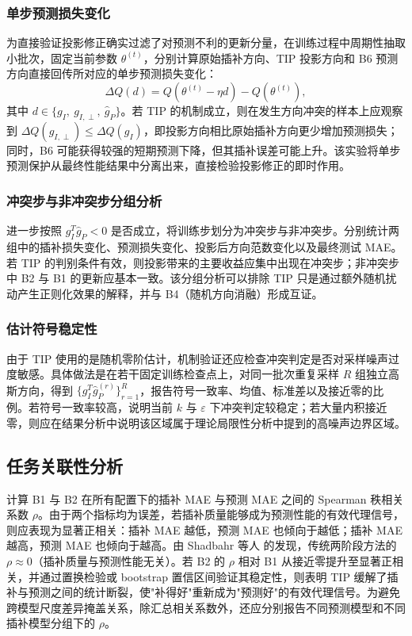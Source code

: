 \documentclass{article}
\begin{document}
\subsubsection{单步预测损失变化}

为直接验证投影修正确实过滤了对预测不利的更新分量，在训练过程中周期性抽取小批次，固定当前参数 $\theta^{(t)}$，分别计算原始插补方向、TIP 投影方向和 B6 预测方向直接回传所对应的单步预测损失变化：
\begin{equation}
	\Delta Q(d)=Q(\theta^{(t)}-\eta d)-Q(\theta^{(t)}),
\end{equation}
其中 $d\in\{g_I,\ g_{I,\perp},\ \hat{g}_P\}$。若 TIP 的机制成立，则在发生方向冲突的样本上应观察到 $\Delta Q(g_{I,\perp}) \leq \Delta Q(g_I)$，即投影方向相比原始插补方向更少增加预测损失；同时，B6 可能获得较强的短期预测下降，但其插补误差可能上升。该实验将单步预测保护从最终性能结果中分离出来，直接检验投影修正的即时作用。

\subsubsection{冲突步与非冲突步分组分析}

进一步按照 $g_I^T\hat{g}_P<0$ 是否成立，将训练步划分为冲突步与非冲突步。分别统计两组中的插补损失变化、预测损失变化、投影后方向范数变化以及最终测试 MAE。若 TIP 的判别条件有效，则投影带来的主要收益应集中出现在冲突步；非冲突步中 B2 与 B1 的更新应基本一致。该分组分析可以排除 TIP 只是通过额外随机扰动产生正则化效果的解释，并与 B4（随机方向消融）形成互证。

\subsubsection{估计符号稳定性}

由于 TIP 使用的是随机零阶估计，机制验证还应检查冲突判定是否对采样噪声过度敏感。具体做法是在若干固定训练检查点上，对同一批次重复采样 $R$ 组独立高斯方向，得到 $\{g_I^T\hat{g}_{P}^{(r)}\}_{r=1}^R$，报告符号一致率、均值、标准差以及接近零的比例。若符号一致率较高，说明当前 $k$ 与 $\varepsilon$ 下冲突判定较稳定；若大量内积接近零，则应在结果分析中说明该区域属于理论局限性分析中提到的高噪声边界区域。

\subsection{任务关联性分析}\label{sec:spearman}

计算 B1 与 B2 在所有配置下的插补 MAE 与预测 MAE 之间的 Spearman 秩相关系数 $\rho$。由于两个指标均为误差，若插补质量能够成为预测性能的有效代理信号，则应表现为显著正相关：插补 MAE 越低，预测 MAE 也倾向于越低；插补 MAE 越高，预测 MAE 也倾向于越高。由 Shadbahr 等人\citep{shadbahr2023} 的发现，传统两阶段方法的 $\rho \approx 0$（插补质量与预测性能无关）。若 B2 的 $\rho$ 相对 B1 从接近零提升至显著正相关，并通过置换检验或 bootstrap 置信区间验证其稳定性，则表明 TIP 缓解了插补与预测之间的统计断裂，使"补得好"重新成为"预测好"的有效代理信号。为避免跨模型尺度差异掩盖关系，除汇总相关系数外，还应分别报告不同预测模型和不同插补模型分组下的 $\rho$。
\end{document}
